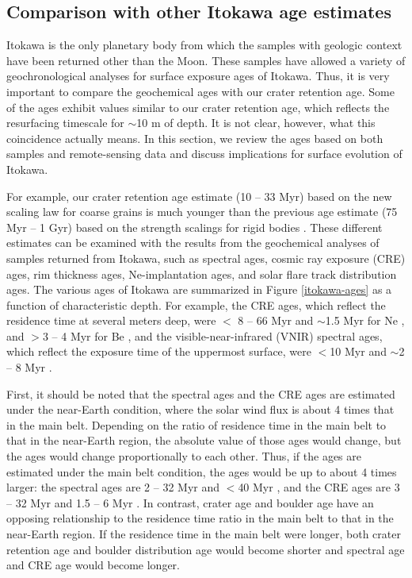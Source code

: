 \documentclass[3p,authoryear]{elsarticle}
\begin{document}
\subsection{Comparison with other Itokawa age estimates}\label{sec:itokawa-sample}
Itokawa is the only planetary body from which the samples with geologic context have been returned other than the Moon. These samples have allowed a variety of geochronological analyses for surface exposure ages of Itokawa. Thus, it is very important to compare the geochemical ages with our crater retention age. Some of the ages exhibit values similar to our crater retention age, which reflects the resurfacing timescale for $\sim$10 m of depth. It is not clear, however, what this coincidence actually means. In this section, we review the ages based on both samples and remote-sensing data and discuss implications for surface evolution of Itokawa.

For example, our crater retention age estimate (10 -- 33 Myr) based on the new scaling law for coarse grains is much younger than the previous age estimate (75 Myr -- 1 Gyr) based on the strength scalings for rigid bodies \citep{michel2009}. These different estimates can be examined with the results from the geochemical analyses of samples returned from Itokawa, such as spectral ages, cosmic ray exposure (CRE) ages, rim thickness ages, Ne-implantation ages, and solar flare track distribution ages. The various ages of Itokawa are summarized in Figure \ref{itokawa-ages} as a function of characteristic depth. For example, the CRE ages, which reflect the residence time at several meters deep, were $<$ 8 -- 66 Myr \citep{nagao2011} and $\sim$1.5 Myr for Ne \citep{meier2014}, and $>$3 -- 4 Myr for Be \citep{nishiizumi2015}, and the visible-near-infrared (VNIR) spectral ages, which reflect the exposure time of the uppermost surface, were $<$10 Myr \citep{koga2014} and $\sim$2 -- 8 Myr \citep{bonal2015}.

First, it should be noted that the spectral ages and the CRE ages are estimated under the near-Earth condition, where the solar wind flux is about 4 times that in the main belt. Depending on the ratio of residence time in the main belt to that in the near-Earth region, the absolute value of those ages would change, but the ages would change proportionally to each other. Thus, if the ages are estimated under the main belt condition, the ages would be up to about 4 times larger: the spectral ages are 2 -- 32 Myr \citep{bonal2015} and $<$40 Myr \citep{koga2014}, and the CRE ages are 3 -- 32 Myr \citep{nagao2011} and 1.5 -- 6 Myr \citep{meier2014}. In contrast, crater age and boulder age have an opposing relationship to the residence time ratio in the main belt to that in the near-Earth region. If the residence time in the main belt were longer, both crater retention age and boulder distribution age would become shorter and spectral age and CRE age would become longer.
\end{document}
